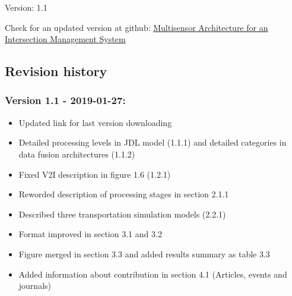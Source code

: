 \begin{titlepage}
    \begin{center}
%   
%        
%		        
%        
%        
%        
%		
%        
{}
Version: 1.1 \\
\vspace{2cm}

      
\end{center}
    
Check for an updated version at github: 
\href{https://github.com/gustavovelascoh/msc-report/wiki}{Multisensor Architecture for an Intersection Management System}


\subsection*{Revision history}
\subsubsection*{Version 1.1 - 2019-01-27:}

	\begin{itemize}
	\item Updated link for last version downloading
	\item Detailed processing levels in JDL model (1.1.1) and detailed categories in data fusion architectures (1.1.2)
	\item Fixed V2I description in figure 1.6 (1.2.1)
	\item Reworded description of processing stages in section 2.1.1
	\item Described three transportation simulation models (2.2.1)
	\item Format improved in section 3.1 and 3.2
	\item Figure merged in section 3.3 and added results summary as table 3.3
	\item Added information about contribution in section 4.1 (Articles, events and journals)
	\end{itemize}



\end{titlepage}
